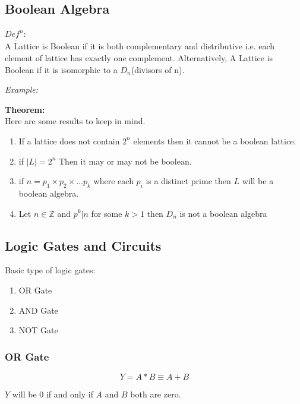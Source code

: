 \documentclass[11pt,letterpaper]{article}
\newenvironment{mytheorem}                    
        {\begin{mdframed}\textbf{Theorem:} \\}
        {\end{mdframed}}
\newenvironment{example}                             
        {\noindent\textit{Example:}\\}
	{}
\newenvironment{definition}
	{\begin{mdframed}$\underline{\textit{Def}^\textit{n}:} $\\}
	{\end{mdframed}}
\begin{document}
\subsection{Boolean Algebra}
\begin{definition}
  A Lattice is Boolean if it is both complementary and distributive i.e. each element of  lattice has exactly one complement. 
  Alternatively, A Lattice is Boolean if it is isomorphic to a $D_n$(divisors of n).
\end{definition}

\begin{example}
\end{example}

\begin{mytheorem}
  \noindent Here are some results to keep in mind.
  \begin{enumerate}
    \item If a lattice does not contain $2^n$ elements then it cannot be a boolean lattice.
    \item if $\lvert L\rvert = 2^n$ Then it may or may not be boolean.
    \item if $n = p_1 \times p_2 \times \dots p_k$ where each $p_i$ is a distinct prime then $L$ will be a boolean algebra.
    \item Let $n \in \mathbb{Z}$ and $p^k | n$ for some $k > 1$ then $D_n$ is not a boolean algebra
  \end{enumerate}
\end{mytheorem}

\subsection{Logic Gates and Circuits}

Basic type of logic gates:
\begin{enumerate}
  \item OR Gate
  \item AND Gate
  \item NOT Gate
\end{enumerate}

\subsubsection{OR Gate}

\[
  Y = A * B \equiv A + B 
\]

$Y$ will be 0 if and only if $A$ and $B$ both are zero.
\end{document}
